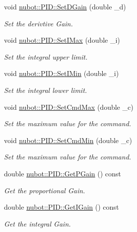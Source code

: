 \begin{DoxyCompactItemize}
void \hyperlink{group__gazebo__common_ga93525f67c0152418f360074e8d6d970d}{nubot\-::\-P\-I\-D\-::\-Set\-D\-Gain} (double \-\_\-d)
\begin{DoxyCompactList}\small\item\em Set the derivtive Gain. \end{DoxyCompactList}\item 
void \hyperlink{group__gazebo__common_ga7a605b62cd1355c137ac6e87911fc83f}{nubot\-::\-P\-I\-D\-::\-Set\-I\-Max} (double \-\_\-i)
\begin{DoxyCompactList}\small\item\em Set the integral upper limit. \end{DoxyCompactList}\item 
void \hyperlink{group__gazebo__common_gabdfd118371fe19fcf63c56dee66892f2}{nubot\-::\-P\-I\-D\-::\-Set\-I\-Min} (double \-\_\-i)
\begin{DoxyCompactList}\small\item\em Set the integral lower limit. \end{DoxyCompactList}\item 
void \hyperlink{group__gazebo__common_ga756b27c805adea693e9af92c767aa981}{nubot\-::\-P\-I\-D\-::\-Set\-Cmd\-Max} (double \-\_\-c)
\begin{DoxyCompactList}\small\item\em Set the maximum value for the command. \end{DoxyCompactList}\item 
void \hyperlink{group__gazebo__common_ga2124f2b2e8d7b9b8aa1a933ac412a5d1}{nubot\-::\-P\-I\-D\-::\-Set\-Cmd\-Min} (double \-\_\-c)
\begin{DoxyCompactList}\small\item\em Set the maximum value for the command. \end{DoxyCompactList}\item 
double \hyperlink{group__gazebo__common_ga1c0443f163e53483369989c4f185b84e}{nubot\-::\-P\-I\-D\-::\-Get\-P\-Gain} () const 
\begin{DoxyCompactList}\small\item\em Get the proportional Gain. \end{DoxyCompactList}\item 
double \hyperlink{group__gazebo__common_ga9aa6fdeab746f430822c02d719a8ba7a}{nubot\-::\-P\-I\-D\-::\-Get\-I\-Gain} () const 
\begin{DoxyCompactList}\small\item\em Get the integral Gain. \end{DoxyCompactList}\item 

\end{DoxyCompactItemize}
